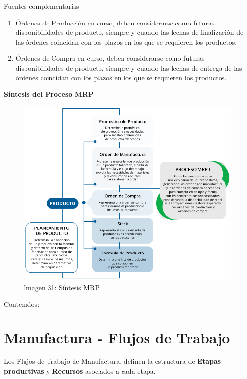 \documentclass[letterpaper,10pt,spanish]{sphinxmanual}
\begin{document}
Fuentes complementarias
\begin{enumerate}
\item {} 
Órdenes de Producción en curso, deben considerarse como futuras disponibilidades de producto, siempre y cuando las fechas de finalización de las órdenes coincidan con los plazos en los que se requieren los productos.

\item {} 
Órdenes de Compra en curso, deben considerarse como futuras disponibilidades de producto, siempre y cuando las fechas de entrega de las órdenes coincidan con los plazos en los que se requieren los productos.

\end{enumerate}

\textbf{Síntesis del Proceso MRP}
\begin{figure}[htbp]
\centering
\capstart

\includegraphics{ly_mrp.png}
\caption{Imagen 31: Síntesis MRP}\end{figure}

Contenidos:


\section{Manufactura - Flujos de Trabajo}
\label{manufactura-flujos:manufactura-flujos-de-trabajo}\label{manufactura-flujos::doc}
Los Flujos de Trabajo de Manufactura, definen la estructura de \textbf{Etapas productivas} y \textbf{Recursos} asociados a cada etapa.
\end{document}

